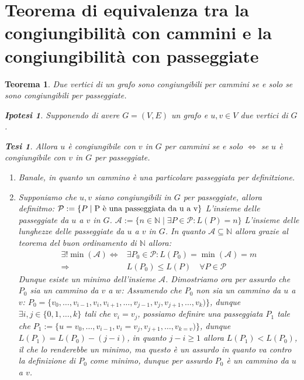 \documentclass{article}
\makeatletter
\renewenvironment{proof}[1][\proofname]{\par
    \pushQED{\qed}%
    \normalfont \topsep6\p@\@plus6\p@\relax
    \trivlist
    \item\relax
    {\itshape
    #1\@addpunct{.}}\hspace\labelsep\ignorespaces
    }{%
    \popQED\endtrivlist\@endpefalse
}
\newtheorem{theorem}{Teorema}[part]
\newtheorem{ipothesis}[lemma]{Ipotesi}
\newtheorem{thesis}[lemma]{Tesi}
\theoremstyle{definition}
\newcommand{\N}{\mathbb{N}}
\makeatother
\begin{document}
    \section{Teorema di equivalenza tra la congiungibilità con cammini e la congiungibilità con passeggiate}
        \begin{theorem}
            Due vertici di un grafo sono congiungibili per cammini se e solo se sono congiungibili per passeggiate.
            \begin{ipothesis}
                Supponendo di avere \(G=(V,E)\) un grafo e \(u,v\in V\) due vertici di \(G\).
            \end{ipothesis}
            \begin{thesis}
                Allora \(u\) è congiungibile con \(v\) in \(G\) per cammini se e solo \(\Leftrightarrow\) se \(u\) è congiungibile con \(v\) in \(G\) per passeggiate.
            \end{thesis}
            \begin{proof}
                \begin{enumerate}
                    \item[$\Rightarrow$] Banale, in quanto un cammino è una particolare passeggiata per definitzione.
                    \item[$\Leftarrow$] Supponiamo che \(u,v\) siano congiungibili in \(G\) per passeggiate, allora definitmo: \(\mathcal{P}:=\{P\mid\\ \text{P è una passeggiata da u a v}\}\) L'insieme delle passeggiate da \(u\) a \(v\) in \(G\). $\mathcal{A}:=\{n\in\N \mid \exists P\in\mathcal{P} : L(P)=n\}$ L'insieme delle lunghezze delle passeggiate da \(u\) a \(v\) in \(G\). 
                        In quanto \(\mathcal{A}\subseteq \N\) allora grazie al teorema del buon ordinamento di \(\N\) allora: 
                        \begin{align*}
                            \exists! \min(\mathcal{A})\Leftrightarrow & \exists P_0\in\mathcal{P}: L(P_0)=\min(\mathcal{A})=m \\
                            \Rightarrow & L(P_0)\leq L(P)\quad \forall P\in\mathcal{P}
                        \end{align*}
                        Dunque esiste un minimo dell'insieme \(\mathcal{A}\).
                        Dimostriamo ora per assurdo che \(P_0\) sia un cammino da \(v\) a \(w\):
                        Assumendo che \(P_0\) non sia un cammino da \(u\) a \(v\): \(P_0=\{v_0,\ldots,v_{i-1},v_i,v_{i+1},\ldots,v_{j-1},v_{j},v_{j+1},\ldots,v_{k})\}\), dunque \(\exists i,j\in\{0,1,\ldots,k\}\) tali che \(v_i=v_j\),
                        possiamo definire una passeggiata \(P_1\) tale che \(P_1:=\{u=v_0,\ldots,v_{i-1},v_i=v_j,v_{j+1},\ldots,v_{k=v})\}\), dunque \(L(P_1)=L(P_0)-(j-i)\), in quanto \(j-i\geq 1\) allora \(L(P_1)<L(P_0)\), il che lo renderebbe un minimo, ma questo è un assurdo in quanto va contro la definizione di \(P_0\) come minimo, dunque per assurdo \(P_0\) è un cammino da \(u\) a \(v\).
                    \end{enumerate}
                    \pushQED{}
            \end{proof}
            \raggedleft{{\ensuremath{\blacksquare}}}
        \end{theorem}
\end{document}

